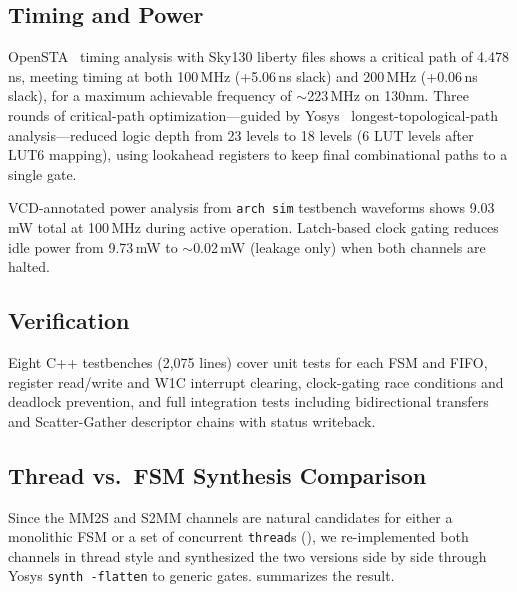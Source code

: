 \documentclass[manuscript]{acmart}
\begin{document}
\subsection{Timing and Power}

OpenSTA~\cite{opensta} timing analysis with Sky130 liberty files shows a critical path of 4.478\,ns, meeting timing at both 100\,MHz (+5.06\,ns slack) and 200\,MHz (+0.06\,ns slack), for a maximum achievable frequency of ${\sim}$223\,MHz on 130nm. Three rounds of critical-path optimization---guided by Yosys~\cite{yosys} longest-topological-path analysis---reduced logic depth from 23 levels to 18 levels (6 LUT levels after LUT6 mapping), using lookahead registers to keep final combinational paths to a single gate.

VCD-annotated power analysis from \texttt{arch sim} testbench waveforms shows 9.03\,mW total at 100\,MHz during active operation. Latch-based clock gating reduces idle power from 9.73\,mW to ${\sim}$0.02\,mW (leakage only) when both channels are halted.

\subsection{Verification}

Eight C++ testbenches (2,075 lines) cover unit tests for each FSM and FIFO, register read/write and W1C interrupt clearing, clock-gating race conditions and deadlock prevention, and full integration tests including bidirectional transfers and Scatter-Gather descriptor chains with status writeback.

\subsection{Thread vs.\ FSM Synthesis Comparison}\label{sec:thread-vs-fsm}

Since the MM2S and S2MM channels are natural candidates for either a monolithic FSM or a set of concurrent \texttt{thread}s (), we re-implemented both channels in thread style and synthesized the two versions side by side through Yosys \texttt{synth -flatten} to generic gates.  summarizes the result.
\end{document}
